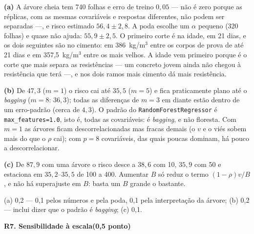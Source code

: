 \documentclass[11pt,a4paper]{article}
\newcommand{\tarefa}[3]{%
  \bigskip\par\noindent
  {\large\bfseries\color{azulufrj}#1. #2}\hfill{\bfseries(#3)}\par
  \nopagebreak\vspace{0.3em}}
\newcommand{\cod}[1]{\texttt{#1}}
\begin{document}
\begin{solucao}
\textbf{(a)} A árvore cheia tem 740 folhas e erro de treino $0{,}05$ --- não é zero
porque as réplicas, com as mesmas covariáveis e respostas diferentes, não podem ser
separadas ---, e risco estimado $56{,}4\pm2{,}8$. A poda escolhe um $\alpha$ pequeno
(320 folhas) e quase não ajuda: $55{,}9\pm2{,}5$. O primeiro corte é na idade, em 21
dias, e os dois seguintes são no cimento: em 386~kg/m$^3$ entre os corpos de prova de
até 21 dias e em 357,5~kg/m$^3$ entre os mais velhos. A idade vem primeiro porque é o
corte que mais separa as resistências --- um concreto jovem ainda não chegou à
resistência que terá ---, e nos dois ramos mais cimento dá mais resistência.

\textbf{(b)} De $47{,}3$ ($m=1$) o risco cai até $35{,}5$ ($m=5$) e fica praticamente
plano até o \emph{bagging} ($m=8$: $36{,}3$); todas as diferenças de $m=3$ em diante
estão dentro de um erro-padrão (cerca de $4{,}3$). O padrão do
\cod{RandomForestRegressor} é \cod{max\_features=1.0}, isto é, todas as covariáveis:
é \emph{bagging}, e não floresta. Com $m=1$ as árvores ficam descorrelacionadas mas
fracas demais (o $v$ e o viés sobem mais do que o $\rho$ cai); com $p=8$ covariáveis,
das quais poucas dominam, há pouco a descorrelacionar.

\textbf{(c)} De $87{,}9$ com uma árvore o risco desce a $38{,}6$ com 10, $35{,}9$ com
50 e estaciona em $35{,}2$--$35{,}5$ de 100 a 400. Aumentar $B$ só reduz o termo
$(1-\rho)v/B$, e não há superajuste em $B$: basta um $B$ grande o bastante.
\end{solucao}

\begin{criterio}
(a) 0,2 --- 0,1 pelos números e pela poda, 0,1 pela interpretação da árvore;
(b) 0,2 --- inclui dizer que o padrão é \emph{bagging}; (c) 0,1.
\end{criterio}

\tarefa{R7}{Sensibilidade à escala}{0,5 ponto}
\end{document}
